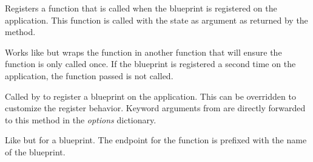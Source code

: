 \documentclass[a4paper,12pt]{sphinxmanual}
\begin{document}
\begin{fulllineitems}
\begin{fulllineitems}
\begin{quote}
\begin{description}
\end{description}\end{quote}

\end{fulllineitems}


\begin{fulllineitems}
\label{api:flask.Blueprint.record}
Registers a function that is called when the blueprint is
registered on the application.  This function is called with the
state as argument as returned by the {\hyperref[api:flask.Blueprint.make_setup_state]{}}
method.

\end{fulllineitems}


\begin{fulllineitems}
\label{api:flask.Blueprint.record_once}
Works like {\hyperref[api:flask.Blueprint.record]{}} but wraps the function in another
function that will ensure the function is only called once.  If the
blueprint is registered a second time on the application, the
function passed is not called.

\end{fulllineitems}


\begin{fulllineitems}
\label{api:flask.Blueprint.register}
Called by {\hyperref[api:flask.Flask.register_blueprint]{}} to register a blueprint
on the application.  This can be overridden to customize the register
behavior.  Keyword arguments from
{\hyperref[api:flask.Flask.register_blueprint]{}} are directly forwarded to this
method in the \emph{options} dictionary.

\end{fulllineitems}


\begin{fulllineitems}
\label{api:flask.Blueprint.route}
Like {\hyperref[api:flask.Flask.route]{}} but for a blueprint.  The endpoint for the
{\hyperref[api:flask.url_for]{}} function is prefixed with the name of the blueprint.


\end{fulllineitems}
\end{fulllineitems}
\end{document}

